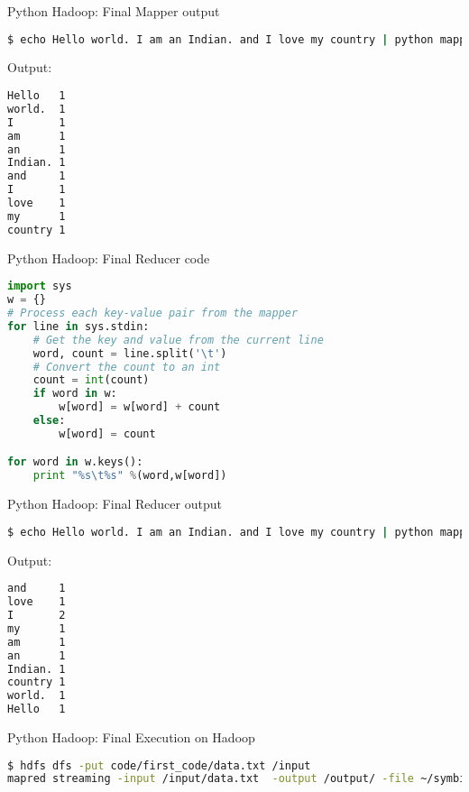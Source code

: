 \documentclass[pdf]{beamer}
\begin{document}
\begin{frame}[fragile]{Python Hadoop: Final Mapper output}
\begin{lstlisting}[language=bash]
$ echo Hello world. I am an Indian. and I love my country | python mapper.py 
\end{lstlisting}
Output:
\begin{lstlisting}[language=bash]
Hello   1
world.  1
I       1
am      1
an      1
Indian. 1
and     1
I       1
love    1
my      1
country 1
\end{lstlisting}
\end{frame}


\begin{frame}[fragile]{Python Hadoop: Final Reducer code}
\begin{lstlisting}[language=python]
import sys
w = {}
# Process each key-value pair from the mapper
for line in sys.stdin:
    # Get the key and value from the current line
    word, count = line.split('\t')
    # Convert the count to an int
    count = int(count)
    if word in w:
        w[word] = w[word] + count
    else:
        w[word] = count

for word in w.keys():
    print "%s\t%s" %(word,w[word])
\end{lstlisting}
\end{frame}



\begin{frame}[fragile]{Python Hadoop: Final Reducer output}
\begin{lstlisting}[language=bash]
$ echo Hello world. I am an Indian. and I love my country | python mapper.py | python reducer.py
\end{lstlisting}
Output:
\begin{lstlisting}[language=bash]
and     1
love    1
I       2
my      1
am      1
an      1
Indian. 1
country 1
world.  1
Hello   1
\end{lstlisting}
\end{frame}


\begin{frame}[fragile]{Python Hadoop: Final Execution on Hadoop}
\begin{lstlisting}[language=bash]
$ hdfs dfs -put code/first_code/data.txt /input
mapred streaming -input /input/data.txt  -output /output/ -file ~/symbiosis/code/first_code/mapper.py -mapper ~/symbiosis/code/first_code/mapper.py -file ~/symbiosis/code/first_code/reducer.py -reducer ~/symbiosis/code/first_code/reducer.py
\end{lstlisting}
\end{frame}
\end{document}
